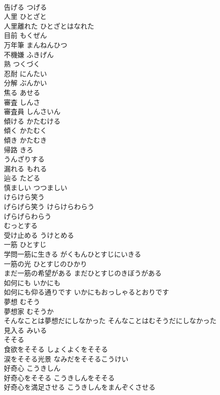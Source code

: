 \documentclass[8pt]{extreport}
\begin{document}
\begin{CJK}{UTF8}{min}
\\	告げる	つげる	
\\	人里	ひとざと	
\\	人里離れた	ひとざとはなれた	
\\	目前	もくぜん	
\\	万年筆	まんねんひつ	
\\	不機嫌	ふきげん	
\\	熟	つくづく	
\\	忍耐	にんたい	
\\	分解	ぶんかい	
\\	焦る	あせる	
\\	審査	しんさ	
\\	審査員	しんさいん	
\\	傾ける	かたむける	
\\	傾く	かたむく	
\\	傾き	かたむき	
\\	帰路	きろ	
\\	うんざりする		
\\	漏れる	もれる	
\\	辿る	たどる	
\\	慎ましい	つつましい	
\\	けらけら笑う 
\\	げらげら笑う	けらけらわらう 
\\	げらげらわらう	
\\	むっとする		
\\	受け止める	うけとめる	
\\	一筋	ひとすじ	
\\	学問一筋に生きる	がくもんひとすじにいきる	
\\	一筋の光	ひとすじのひかり	
\\	まだ一筋の希望がある	まだひとすじのきぼうがある	
\\	如何にも	いかにも	
\\	如何にも仰る通りです	いかにもおっしゃるとおりです	
\\	夢想	むそう	
\\	夢想家	むそうか	
\\	そんなことは夢想だにしなかった	そんなことはむそうだにしなかった	
\\	見入る	みいる	
\\	そそる		
\\	食欲をそそる	しょくよくをそそる	
\\	涙をそそる光景	なみだをそそるこうけい	
\\	好奇心	こうきしん	
\\	好奇心をそそる	こうきしんをそそる	
\\	好奇心を満足させる	こうきしんをまんぞくさせる	

\end{CJK}
\end{document}
